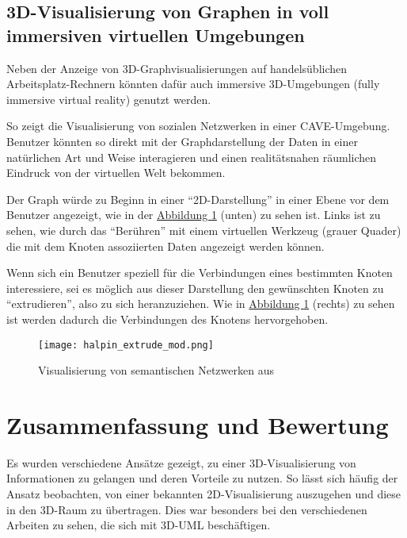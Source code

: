 \documentclass[a4paper,10pt]{sphinxmanual}
\begin{document}
\subsection{3D-Visualisierung von Graphen in voll immersiven virtuellen Umgebungen}
\label{related:d-visualisierung-von-graphen-in-voll-immersiven-virtuellen-umgebungen}\label{related:halpin-social-net}
Neben der Anzeige von 3D-Graphvisualisierungen auf handelsüblichen Arbeitsplatz-Rechnern könnten dafür auch immersive 3D-Umgebungen (fully immersive virtual reality) genutzt werden.

So zeigt \cite{halpin_exploring_2008} die Visualisierung von sozialen Netzwerken in einer CAVE-Umgebung.
Benutzer könnten so direkt mit der Graphdarstellung der Daten in einer natürlichen Art und Weise interagieren und einen realitätsnahen räumlichen Eindruck von der virtuellen Welt bekommen.

Der Graph würde zu Beginn in einer "`2D-Darstellung"' in einer Ebene vor dem Benutzer angezeigt, wie in der \hyperref[related:halpin-extrude]{Abbildung  \ref*{related:halpin-extrude}} (unten) zu sehen ist.
Links ist zu sehen, wie durch das "`Berühren"' mit einem virtuellen Werkzeug (grauer Quader) die mit dem Knoten assoziierten Daten angezeigt werden können.

Wenn sich ein Benutzer speziell für die Verbindungen eines bestimmten Knoten interessiere, sei es möglich aus dieser Darstellung den gewünschten Knoten zu "`extrudieren"', also zu sich heranzuziehen.
Wie in \hyperref[related:halpin-extrude]{Abbildung  \ref*{related:halpin-extrude}} (rechts) zu sehen ist werden dadurch die Verbindungen des Knotens hervorgehoben.
\begin{figure}[htbp]
\centering
\capstart

\texttt{[image: halpin\_extrude\_mod.png]}
\caption{Visualisierung von semantischen Netzwerken aus \cite{halpin_exploring_2008}}\label{related:halpin-extrude}\end{figure}


\section{Zusammenfassung und Bewertung}
\label{related:zusammenfassung-und-bewertung}\label{related:related-zusammenfassung}
Es wurden verschiedene Ansätze gezeigt, zu einer 3D-Visualisierung von Informationen zu gelangen und deren Vorteile zu nutzen.
So lässt sich häufig der Ansatz beobachten, von einer bekannten 2D-Visualisierung auszugehen und diese in den 3D-Raum zu übertragen.
Dies war besonders bei den verschiedenen Arbeiten zu sehen, die sich mit 3D-UML beschäftigen.
\end{document}
